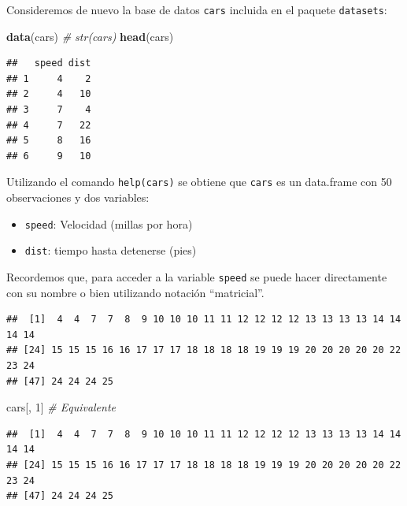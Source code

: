 \documentclass[]{book}
\newenvironment{Shaded}{\begin{snugshade}}{\end{snugshade}}
\newcommand{\KeywordTok}[1]{\textcolor[rgb]{0.13,0.29,0.53}{\textbf{#1}}}
\newcommand{\DecValTok}[1]{\textcolor[rgb]{0.00,0.00,0.81}{#1}}
\newcommand{\CommentTok}[1]{\textcolor[rgb]{0.56,0.35,0.01}{\textit{#1}}}
\newcommand{\OperatorTok}[1]{\textcolor[rgb]{0.81,0.36,0.00}{\textbf{#1}}}
\newcommand{\NormalTok}[1]{#1}
\begin{document}
Consideremos de nuevo la base de datos \texttt{cars} incluida en el
paquete \texttt{datasets}:

\begin{Shaded}
\begin{Highlighting}[]
\KeywordTok{data}\NormalTok{(cars)}
\CommentTok{# str(cars)}
\KeywordTok{head}\NormalTok{(cars)}
\end{Highlighting}
\end{Shaded}

\begin{verbatim}
##   speed dist
## 1     4    2
## 2     4   10
## 3     7    4
## 4     7   22
## 5     8   16
## 6     9   10
\end{verbatim}

Utilizando el comando \texttt{help(cars)} se obtiene que \texttt{cars}
es un data.frame con 50 observaciones y dos variables:

\begin{itemize}
\item
  \texttt{speed}: Velocidad (millas por hora)
\item
  \texttt{dist}: tiempo hasta detenerse (pies)
\end{itemize}

Recordemos que, para acceder a la variable \texttt{speed} se puede hacer
directamente con su nombre o bien utilizando notación ``matricial''.

\begin{Shaded}
\end{Shaded}

\begin{verbatim}
##  [1]  4  4  7  7  8  9 10 10 10 11 11 12 12 12 12 13 13 13 13 14 14 14 14
## [24] 15 15 15 16 16 17 17 17 18 18 18 18 19 19 19 20 20 20 20 20 22 23 24
## [47] 24 24 24 25
\end{verbatim}

\begin{Shaded}
\begin{Highlighting}[]
\NormalTok{cars[, }\DecValTok{1}\NormalTok{]  }\CommentTok{# Equivalente}
\end{Highlighting}
\end{Shaded}

\begin{verbatim}
##  [1]  4  4  7  7  8  9 10 10 10 11 11 12 12 12 12 13 13 13 13 14 14 14 14
## [24] 15 15 15 16 16 17 17 17 18 18 18 18 19 19 19 20 20 20 20 20 22 23 24
## [47] 24 24 24 25
\end{verbatim}
\end{document}
